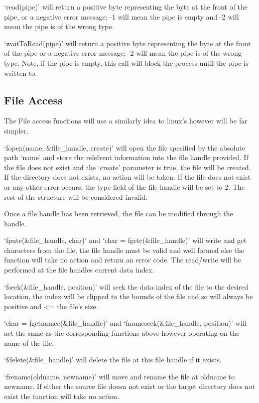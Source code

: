 \documentclass[a4paper]{report}
\begin{document}
`read(pipe)' will return a positive byte representing the byte at the front of the pipe, or a negative error message; -1 will mean the pipe is empty and -2 will mean the pipe is of the wrong type.

`waitToRead(pipe)' will return a positive byte representing the byte at the front of the pipe or a negative error message; -2 will mean the pipe is of the wrong type. Note, if the pipe is empty, this call will block the process until the pipe is written to.


\subsection{File Access}

The File access functions will use a similarly idea to linux's however will be far simpler.

`fopen(name, \&file\_handle, create)' will open the file specified by the absolute path `name' and store the relelvent information into the file handle provided. If the file does not exist and the `create' parameter is true, the file will be created. If the directory does not exists, no action will be taken. If the file does not exist or any other error occurs, the type field of the file handle will be set to 2. The rest of the structure will be considered invalid.

Once a file handle has been retrieved, the file can be modified through the handle.

`fputc(\&file\_handle, char)' and `char = fgetc(\&file\_handle)' will write and get characters from the file, the file handle must be valid and well formed else the function will take no action and return an error code. The read/write will be performed at the file handles current data index.

`fseek(\&file\_handle, position)' will seek the data index of the file to the desired location, the index will be clipped to the bounds of the file and so will always be positive and \textless = the file's size.

`char = fgetnamec(\&file\_handle)' and `fnameseek(\&file\_handle, position)' will act the same as the corresponding functions above however operating on the name of the file.

`fdelete(\&file\_handle)' will delete the file at this file handle if it exists.

`frename(oldname, newname)' will move and rename the file at oldname to newname. If either the source file doesn not exist or the target directory does not exist the function will take no action.
\end{document}
